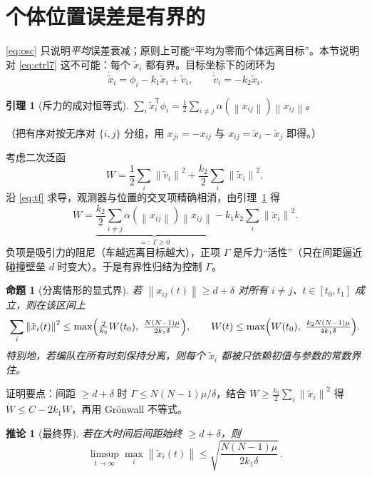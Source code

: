 \documentclass[11pt,a4paper]{ctexart}
\theoremstyle{plain}
\newtheorem{proposition}{命题}
\newtheorem{lemma}{引理}
\newtheorem{corollary}{推论}
\theoremstyle{definition}
\theoremstyle{remark}
\newcommand{\txi}{\tilde{x}}
\newcommand{\tv}{\tilde{v}}
\newcommand{\norm}[1]{\left\|#1\right\|}
\begin{document}
\section{个体位置误差是有界的}
\label{sec:bounded}

\eqref{eq:osc} 只说明\emph{平均}误差衰减；原则上可能“平均为零而个体远离目标”。本节说明对
\eqref{eq:ctrl7} 这不可能：每个 $\txi_i$ 都有界。目标坐标下的闭环为
\begin{equation}
  \dot\txi_i=\phi_i-k_1\txi_i+\tv_i,\qquad \dot\tv_i=-k_2\txi_i .
  \label{eq:tf}
\end{equation}

\begin{lemma}[斥力的成对恒等式]
\label{lem:pair}
$\displaystyle\sum_{i}\txi_i^{\mathsf T}\phi_i=\tfrac12\sum_{i\ne j}\alpha(\norm{x_{ij}})\norm{x_{ij}}$。
\end{lemma}
（把有序对按无序对 $\{i,j\}$ 分组，用 $x_{ji}=-x_{ij}$ 与 $x_{ij}=\txi_i-\txi_j$ 即得。）

考虑二次泛函
\begin{equation}
  W=\frac12\sum_i\norm{\tv_i}^2+\frac{k_2}{2}\sum_i\norm{\txi_i}^2 ,
  \label{eq:W}
\end{equation}
沿 \eqref{eq:tf} 求导，观测器与位置的交叉项精确相消，由引理~\ref{lem:pair} 得
\begin{equation}
  \dot W=\underbrace{\frac{k_2}{2}\sum_{i\ne j}\alpha(\norm{x_{ij}})\norm{x_{ij}}}_{=:\ \Gamma\ge0}
        -k_1k_2\sum_i\norm{\txi_i}^2 .
  \label{eq:Wd}
\end{equation}
负项是吸引力的阻尼（车越远离目标越大），正项 $\Gamma$ 是斥力“活性”（只在间距逼近碰撞壁垒
$d$ 时变大）。于是有界性归结为控制 $\Gamma$。

\begin{proposition}[分离情形的显式界]
\label{prop:sep}
若 $\norm{x_{ij}(t)}\ge d+\delta$ 对所有 $i\ne j$、$t\in[t_0,t_1]$ 成立，则在该区间上
\begin{equation}
  \sum_i\norm{\txi_i(t)}^2\le\max\Bigl(\tfrac{2}{k_2}W(t_0),\ \tfrac{N(N-1)\mu}{2k_1\delta}\Bigr),
  \qquad
  W(t)\le\max\Bigl(W(t_0),\ \tfrac{k_2N(N-1)\mu}{4k_1\delta}\Bigr).
\end{equation}
特别地，若编队在所有时刻保持分离，则每个 $\txi_i$ 都被只依赖初值与参数的常数界住。
\end{proposition}
证明要点：间距 $\ge d+\delta$ 时 $\Gamma\le N(N-1)\mu/\delta$，结合 $W\ge\frac{k_2}{2}\sum_i\norm{\txi_i}^2$
得 $\dot W\le C-2k_1W$，再用 Gr\"onwall 不等式。

\begin{corollary}[最终界]
若在大时间后间距始终 $\ge d+\delta$，则
\begin{equation*}
  \limsup_{t\to\infty}\max_{i}\norm{\txi_i(t)}\le\sqrt{\frac{N(N-1)\mu}{2k_1\delta}}\,.
\end{equation*}
\end{corollary}
\end{document}
